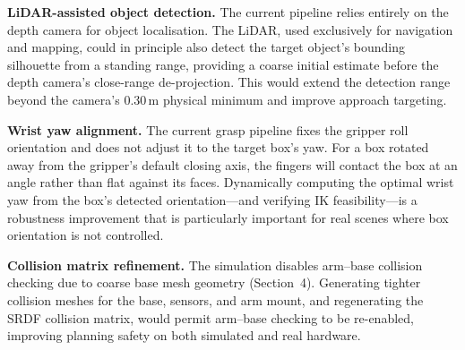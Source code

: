 \textbf{LiDAR-assisted object detection.} The current pipeline relies entirely on the
depth camera for object localisation. The LiDAR, used exclusively for navigation and
mapping, could in principle also detect the target object's bounding silhouette from a
standing range, providing a coarse initial estimate before the depth camera's close-range
de-projection. This would extend the detection range beyond the camera's 0.30\,m
physical minimum and improve approach targeting.

\textbf{Wrist yaw alignment.} The current grasp pipeline fixes the gripper roll
orientation and does not adjust it to the target box's yaw. For a box rotated away from
the gripper's default closing axis, the fingers will contact the box at an angle rather
than flat against its faces. Dynamically computing the optimal wrist yaw from the
box's detected orientation---and verifying IK feasibility---is a robustness improvement
that is particularly important for real scenes where box orientation is not controlled.

\textbf{Collision matrix refinement.} The simulation disables arm--base collision
checking due to coarse base mesh geometry (Section~4). Generating tighter collision
meshes for the base, sensors, and arm mount, and regenerating the SRDF collision matrix,
would permit arm--base checking to be re-enabled, improving planning safety on both
simulated and real hardware.
